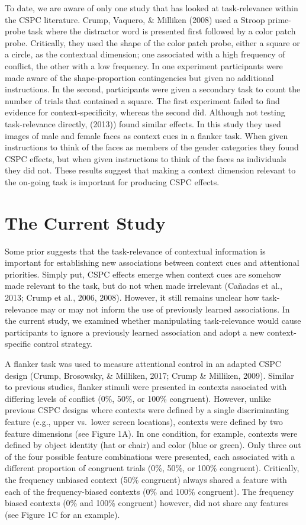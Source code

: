 \documentclass[english,,man,floatsintext]{apa6}
\begin{document}
To date, we are aware of only one study that has looked at task-relevance within the CSPC literature. Crump, Vaquero, \& Milliken (2008) used a Stroop prime-probe task where the distractor word is presented first followed by a color patch probe. Critically, they used the shape of the color patch probe, either a square or a circle, as the contextual dimension; one associated with a high frequency of conflict, the other with a low frequency. In one experiment participants were made aware of the shape-proportion contingencies but given no additional instructions. In the second, participants were given a secondary task to count the number of trials that contained a square. The first experiment failed to find evidence for context-specificity, whereas the second did. Although not testing task-relevance directly, (2013)) found similar effects. In this study they used images of male and female faces as context cues in a flanker task. When given instructions to think of the faces as members of the gender categories they found CSPC effects, but when given instructions to think of the faces as individuals they did not. These results suggest that making a context dimension relevant to the on-going task is important for producing CSPC effects.

\hypertarget{the-current-study}{%
\section{The Current Study}\label{the-current-study}}

Some prior suggests that the task-relevance of contextual information is important for establishing new associations between context cues and attentional priorities. Simply put, CSPC effects emerge when context cues are somehow made relevant to the task, but do not when made irrelevant (Cañadas et al., 2013; Crump et al., 2006, 2008). However, it still remains unclear how task-relevance may or may not inform the use of previously learned associations. In the current study, we examined whether manipulating task-relevance would cause participants to ignore a previously learned association and adopt a new context-specific control strategy.

A flanker task was used to measure attentional control in an adapted CSPC design (Crump, Brosowsky, \& Milliken, 2017; Crump \& Milliken, 2009). Similar to previous studies, flanker stimuli were presented in contexts associated with differing levels of conflict (0\%, 50\%, or 100\% congruent). However, unlike previous CSPC designs where contexts were defined by a single discriminating feature (e.g., upper vs.~lower screen locations), contexts were defined by two feature dimensions (see Figure 1A). In one condition, for example, contexts were defined by object identity (hat or chair) and color (blue or green). Only three out of the four possible feature combinations were presented, each associated with a different proportion of congruent trials (0\%, 50\%, or 100\% congruent). Critically, the frequency unbiased context (50\% congruent) always shared a feature with each of the frequency-biased contexts (0\% and 100\% congruent). The frequency biased contexts (0\% and 100\% congruent) however, did not share any features (see Figure 1C for an example).
\end{document}
